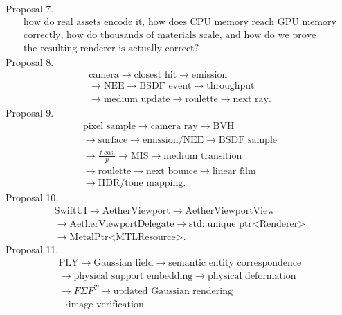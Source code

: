 \documentclass[11pt,twoside]{article}
\begin{document}
\clearpage
\noindent Proposal 7.
\[
\boxed{\begin{gathered}\text{how do real assets encode it, how does CPU memory reach GPU memory}\\\text{correctly, how do thousands of materials scale, and how do we prove}\\\text{the resulting renderer is actually correct?}\end{gathered}}
\]
\clearpage
\noindent Proposal 8.
\[
\begin{gathered}\text{camera}\rightarrow\text{closest hit}\rightarrow\text{emission}\\\rightarrow\text{NEE}\rightarrow\text{BSDF event}\rightarrow\text{throughput}\\\rightarrow\text{medium update}\rightarrow\text{roulette}\rightarrow\text{next ray}.\end{gathered}
\]
\clearpage
\noindent Proposal 9.
\[
\begin{gathered}\text{pixel sample}\rightarrow\text{camera ray}\rightarrow\text{BVH}\\\rightarrow\text{surface}\rightarrow\text{emission/NEE}\rightarrow\text{BSDF sample}\\\rightarrow\frac{f\cos}{p}\rightarrow\text{MIS}\rightarrow\text{medium transition}\\\rightarrow\text{roulette}\rightarrow\text{next bounce}\rightarrow\text{linear film}\\\rightarrow\text{HDR/tone mapping}.\end{gathered}
\]
\clearpage
\noindent Proposal 10.
\[
\begin{gathered}\text{SwiftUI}\rightarrow\text{AetherViewport}\rightarrow\text{AetherViewportView}\\\rightarrow\text{AetherViewportDelegate}\rightarrow\text{std::unique\_ptr<Renderer>}\\\rightarrow\text{MetalPtr<MTLResource>}.\end{gathered}
\]
\clearpage
\noindent Proposal 11.
\[
\boxed{\begin{gathered}\text{PLY}\rightarrow\text{Gaussian field}\rightarrow\text{semantic entity correspondence}\\\rightarrow\text{physical support embedding}\rightarrow\text{physical deformation}\\\rightarrow F\Sigma F^T\rightarrow\text{updated Gaussian rendering}\\\rightarrow\text{image verification}\end{gathered}}
\]
\clearpage
\end{document}
